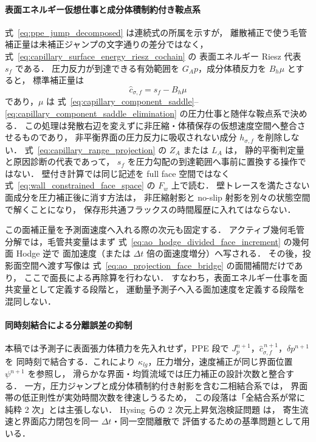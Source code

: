 \paragraph{表面エネルギー仮想仕事と成分体積制約付き鞍点系}
式~\eqref{eq:ppe_jump_decomposed} は連続式の所属を示すが，
離散補正で使う毛管補正量は未補正ジャンプの文字通りの差分ではなく，
式~\eqref{eq:capillary_surface_energy_riesz_cochain} の
表面エネルギー Riesz 代表 $s_f$ である．
圧力反力が到達できる有効範囲を $G_Ap$，成分体積反力を $B_h\mu$ とすると，
標準補正量は
\[
  \widehat c_{\sigma,f}=s_f-B_h\mu
\]
であり，$\mu$ は
式~\eqref{eq:capillary_component_saddle}--\eqref{eq:capillary_component_saddle_elimination}
の圧力仕事と随伴な鞍点系で決める．
この処理は発散右辺を変えずに非圧縮・体積保存の仮想速度空間へ整合させるものであり，
非平衡界面の圧力反力に吸収されない成分
$h_{\sigma,f}$ を削除しない．
式~\eqref{eq:capillary_range_projection} の $Z_A$ または $L_A$ は，
静的平衡判定量と原因診断の代表であって，
$s_f$ を圧力勾配の到達範囲へ事前に置換する操作ではない．
壁付き計算では同じ記述を full face 空間ではなく
式~\eqref{eq:wall_constrained_face_space} の $F_w$ 上で読む．
壁トレースを満たさない面成分を圧力補正後に消す方法は，
非圧縮射影と no-slip 射影を別々の状態空間で解くことになり，
保存形共通フラックスの時間履歴に入れてはならない．

この面補正量を予測面速度へ入れる際の次元も固定する．
アクティブ幾何毛管分解では，毛管共変量はまず
式~\eqref{eq:ao_hodge_divided_face_increment} の幾何面 Hodge 逆で
面加速度（または $\Delta t$ 倍の面速度増分）へ写される．
その後，投影面空間へ渡す写像は
式~\eqref{eq:ao_projection_face_bridge} の面間補間だけであり，
ここで面長による再除算を行わない．
すなわち，表面エネルギー仕事を面共変量として定義する段階と，
運動量予測子へ入る面加速度を定義する段階を混同しない．

\paragraph{同時刻結合による分離誤差の抑制}
本稿では予測子に表面張力体積力を先入れせず，PPE 段で
$J_p^{n+1}$，$\widehat c_{\sigma,f}^{\,n+1}$，$\delta p^{n+1}$ を
同時刻で結合する．これにより
$\kappa_{lg}$，圧力増分，速度補正が同じ界面位置 $\psi^{n+1}$ を参照し，
滑らかな界面・均質流域では圧力補正の設計次数と整合する．
一方，圧力ジャンプと成分体積制約付き射影を含む二相結合系では，
界面帯の低正則性が実効時間次数を律速しうるため，
この段落は「全結合系が常に純粋 2 次」とは主張しない．
Hysing らの 2 次元上昇気泡検証問題 \cite{Hysing2009} は，
寄生流速と界面応力閉包を同一 $\Delta t$・同一空間離散で
評価するための基準問題として用いる．

